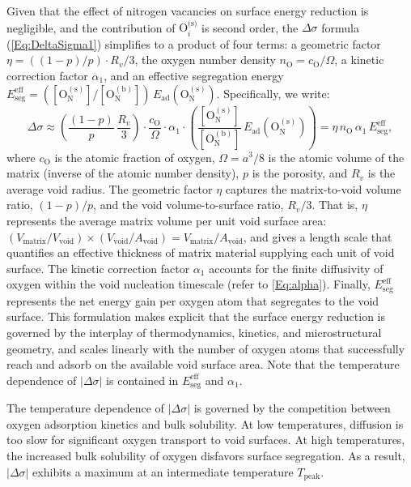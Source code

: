\documentclass[preprint,12pt,sort&compress]{elsarticle}
\newcommand{\?}{\stackrel{?}{=}}
\begin{document}
Given that the effect of nitrogen vacancies on surface energy reduction is negligible, and the contribution of $\text{O}_i^{\text{(s)}}$ is second order, the $\Delta \sigma$ formula (\cref{Eq:DeltaSigma1}) simplifies to a product of four terms: a geometric factor $\eta = ((1 - p)/p) \cdot R_v/3$, the oxygen number density $n_\text{O} = c_\text{O} / \Omega$, a kinetic correction factor $\alpha_1$, and an effective segregation energy $E_\text{seg}^\text{eff} = ( [\text{O}_\text{N}^{(\text{s})}] / [\text{O}_\text{N}^{(\text{b})}] ) \, E_\text{ad}(\text{O}_\text{N}^{(\text{s})})$. Specifically, we write:
\begin{equation}
\Delta \sigma \approx \left( \frac{(1 - p)}{p} \, \frac{R_v}{3} \right) \cdot \frac{c_\text{O}}{\Omega} \cdot \alpha_1 \cdot \left( \frac{ [ \text{O}_\text{N}^{(\text{s})} ] }{ [ \text{O}_\text{N}^{(\text{b})} ] } \, E_\text{ad}( \text{O}_\text{N}^{(\text{s})} ) \right) = \eta \, n_\text{O} \, \alpha_1 \, E_\text{seg}^\text{eff},
\label{Eq:DeltaSigmaSimple}
\end{equation}
where $c_\text{O}$ is the atomic fraction of oxygen, $\Omega = a^3/8$ is the atomic volume of the matrix (inverse of the atomic number density), $p$ is the porosity, and $R_v$ is the average void radius. The geometric factor $\eta$ captures the matrix-to-void volume ratio, $(1-p)/p$, and the void volume-to-surface ratio, $R_v/3$. That is, $\eta$ represents the average matrix volume per unit void surface area: $(V_\text{matrix}/V_\text{void}) \times (V_\text{void}/A_\text{void}) = V_\text{matrix} / A_\text{void}$, and gives a length scale that quantifies an effective thickness of matrix material supplying each unit of void surface. The kinetic correction factor $\alpha_1$ accounts for the finite diffusivity of oxygen within the void nucleation timescale (refer to \cref{Eq:alpha}). Finally, $E_\text{seg}^\text{eff}$ represents the net energy gain per oxygen atom that segregates to the void surface. This formulation makes explicit that the surface energy reduction is governed by the interplay of thermodynamics, kinetics, and microstructural geometry, and scales linearly with the number of oxygen atoms that successfully reach and adsorb on the available void surface area. Note that the temperature dependence of $|\Delta \sigma|$ is contained in $E_\text{seg}^{\text{eff}}$ and $\alpha_1$.

The temperature dependence of $|\Delta\sigma|$ is governed by the competition between oxygen adsorption kinetics and bulk solubility. At low temperatures, diffusion is too slow for significant oxygen transport to void surfaces. At high temperatures, the increased bulk solubility of oxygen disfavors surface segregation. As a result, $|\Delta\sigma|$ exhibits a maximum at an intermediate temperature $T_\text{peak}$.
\end{document}
